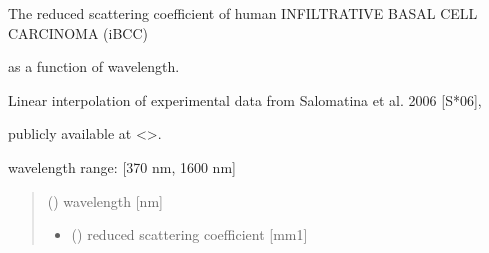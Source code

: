 \documentclass[letterpaper,10pt,english]{sphinxmanual}
\begin{document}
\begin{fulllineitems}
\label{\detokenize{04_scattering_coefficient:skinoptics.scattering_coefficient.rmus_iBCC_Salomatina}}
\pysigstartsignatures
{}
\pysigstopsignatures
\begin{DUlineblock}{0em}
\item[] The reduced scattering coefficient of human INFILTRATIVE BASAL CELL CARCINOMA (iBCC)
\item[] as a function of wavelength.
\item[] Linear interpolation of experimental data from Salomatina et al. 2006 {[}S*06{]},
\item[] publicly available at \textless{}\textgreater{}.
\end{DUlineblock}

\begin{DUlineblock}{0em}
\item[] wavelength range: {[}370 nm, 1600 nm{]}
\end{DUlineblock}
\begin{quote}\begin{description}
\sphinxAtStartPar
{} () \textendash{} wavelength {[}nm{]}

\sphinxAtStartPar
\begin{itemize}
\item {} 
\sphinxAtStartPar
{} () \textendash{} reduced scattering coefficient {[}mm\sphinxhyphen{}1{]}

\end{itemize}


\end{description}\end{quote}

\end{fulllineitems}

\end{document}
